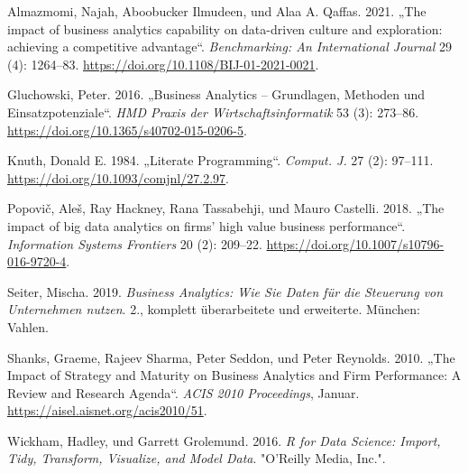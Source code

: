 \documentclass[
  letterpaper,
  DIV=11]{scrreprt}
\newlength{\cslhangindent}
\newlength{\cslentryspacingunit} %
\newenvironment{CSLReferences}[2] %
 {%
  \setlength{\parindent}{0pt}
  \ifodd #1
  \let\oldpar\par
  \def\par{\hangindent=\cslhangindent\oldpar}
  \fi
  \setlength{\parskip}{#2\cslentryspacingunit}
 }%
 {}
\begin{document}
\hypertarget{refs}{}
\begin{CSLReferences}{1}{0}
\leavevmode{}%
Almazmomi, Najah, Aboobucker Ilmudeen, und Alaa A. Qaffas. 2021. {„The
impact of business analytics capability on data-driven culture and
exploration: achieving a competitive advantage``}. \emph{Benchmarking:
An International Journal} 29 (4): 1264--83.
\url{https://doi.org/10.1108/BIJ-01-2021-0021}.

\leavevmode{}%
Gluchowski, Peter. 2016. {„Business {Analytics} -- {Grundlagen},
{Methoden} und {Einsatzpotenziale}``}. \emph{HMD Praxis der
Wirtschaftsinformatik} 53 (3): 273--86.
\url{https://doi.org/10.1365/s40702-015-0206-5}.

\leavevmode{}%
Knuth, Donald E. 1984. {„Literate Programming``}. \emph{Comput. J.} 27
(2): 97--111. \url{https://doi.org/10.1093/comjnl/27.2.97}.

\leavevmode{}%
Popovič, Aleš, Ray Hackney, Rana Tassabehji, und Mauro Castelli. 2018.
{„The impact of big data analytics on firms' high value business
performance``}. \emph{Information Systems Frontiers} 20 (2): 209--22.
\url{https://doi.org/10.1007/s10796-016-9720-4}.

\leavevmode{}%
Seiter, Mischa. 2019. \emph{Business {Analytics}: {Wie} {Sie} {Daten}
für die {Steuerung} von {Unternehmen} nutzen}. 2., komplett
überarbeitete und erweiterte. München: Vahlen.

\leavevmode{}%
Shanks, Graeme, Rajeev Sharma, Peter Seddon, und Peter Reynolds. 2010.
{„The {Impact} of {Strategy} and {Maturity} on {Business} {Analytics}
and {Firm} {Performance}: {A} {Review} and {Research} {Agenda}``}.
\emph{ACIS 2010 Proceedings}, Januar.
\url{https://aisel.aisnet.org/acis2010/51}.

\leavevmode{}%
Wickham, Hadley, und Garrett Grolemund. 2016. \emph{R for {Data}
{Science}: {Import}, {Tidy}, {Transform}, {Visualize}, and {Model}
{Data}}. "O'Reilly Media, Inc.".

\end{CSLReferences}
\end{document}
